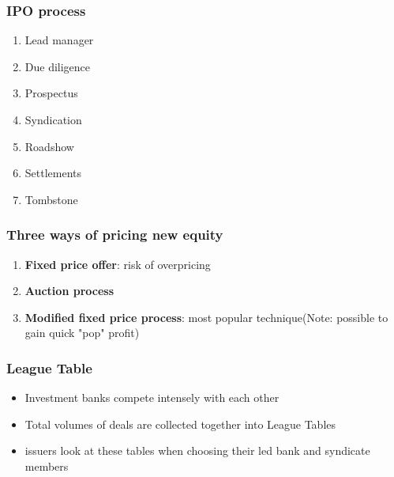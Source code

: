 \documentclass{article}
\theoremstyle{definition}
\theoremstyle{thrm}
\theoremstyle{lma}
\theoremstyle{ppst}
\theoremstyle{crlr}
\begin{document}
\subsubsection{IPO process}
\begin{enumerate}
	\item Lead manager
	\item Due diligence
	\item Prospectus
	\item Syndication
	\item Roadshow
	\item Settlements
	\item Tombstone
\end{enumerate}
\subsubsection{Three ways of pricing new equity}
\begin{enumerate}
	\item \textbf{Fixed price offer}: risk of overpricing
	\item \textbf{Auction process}
	\item \textbf{Modified fixed price process}: most popular technique(Note: possible to gain quick "pop" profit)
\end{enumerate} 

\subsubsection{League Table}
\begin{itemize}
	\item Investment banks compete intensely with each other
	\item Total volumes of deals are collected together into League Tables
	\item issuers look at these tables when choosing their led bank and syndicate members
\end{itemize}
\end{document}
